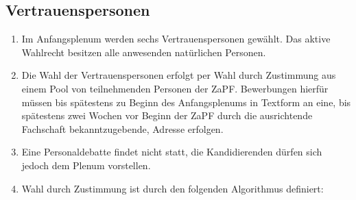 \documentclass[
  a4paper,
  oneside]{scrartcl}
\providecommand{\tightlist}{%
  \setlength{\itemsep}{0pt}\setlength{\parskip}{0pt}}
\begin{document}
\subsection{Vertrauenspersonen}\label{vertrauenspersonen}

\begin{enumerate}
\def\labelenumi{\arabic{enumi}.}
\tightlist
\item
  Im Anfangsplenum werden sechs Vertrauenspersonen gewählt. Das aktive
  Wahlrecht besitzen alle anwesenden natürlichen Personen.
\item
  Die Wahl der Vertrauenspersonen erfolgt per Wahl durch Zustimmung aus
  einem Pool von teilnehmenden Personen der ZaPF. Bewerbungen hierfür
  müssen bis spätestens zu Beginn des Anfangsplenums in Textform an
  eine, bis spätestens zwei Wochen vor Beginn der ZaPF durch die
  ausrichtende Fachschaft bekanntzugebende, Adresse erfolgen.
\item
  Eine Personaldebatte findet nicht statt, die Kandidierenden dürfen
  sich jedoch dem Plenum vorstellen.
\item
  Wahl durch Zustimmung ist durch den folgenden Algorithmus definiert:


\end{enumerate}
\end{document}

